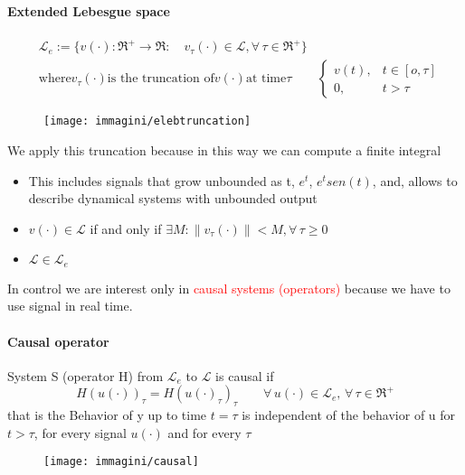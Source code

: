 \paragraph{Extended Lebesgue space}
\[
\begin{aligned}
	&\mathcal{L}_e:=\{v(\cdot):\Re^+\to\Re:\quad v_{\tau}(\cdot) \in \mathcal{L},\forall\,\tau \in\Re^+\}\\
	&\text{where} v_{\tau}(\cdot) \text{is the truncation of} v(\cdot) \text{at time} \tau
	&\begin{cases}
		v(t), & t\in[o,\tau]\\
		0, & t>\tau
	\end{cases}
\end{aligned}
\]
\begin{figure}[H]
	\centering
	\texttt{[image: immagini/elebtruncation]}
	\caption{}
	\label{fig:elebtruncation}
\end{figure}
We apply this truncation because in this way we can compute a finite integral
\begin{remark}
	\begin{itemize}
		\item This includes signals that grow unbounded as t, $e^t$, $e^tsen(t)$, and, allows to describe dynamical systems with unbounded output
		\item $v(\cdot)\in \mathcal{L}$ if and only if $\exists M: \|v_{\tau}(\cdot)\|<M,\forall\,\tau\ge0$
		\item $\mathcal{L}\in\mathcal{L}_e$
	\end{itemize}
\end{remark}
In control we are interest only in \textcolor{red}{causal systems (operators)} because we have to use signal in real time.
\paragraph{Causal operator}
\begin{defn}
		System S (operator H) from $\mathcal{L}_e$ to $\mathcal{L}$ is causal if \[H(u(\cdot))_{\tau}=H(u(\cdot)_{\tau})_{\tau}\qquad \forall\, u(\cdot)\in\mathcal{L}_e,\, \forall\, \tau \in \Re^+\]
that is the Behavior of y up to time $t=\tau$ is independent of the behavior of u for $t>\tau$, for every signal $u(\cdot)$ and for every $\tau$
\end{defn}
\begin{figure}[H]
	\centering
	\texttt{[image: immagini/causal]}
	\caption{}
	\label{fig:causal}
\end{figure}
